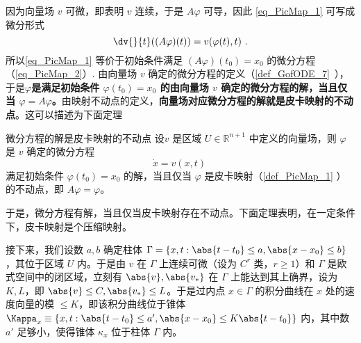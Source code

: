 因为向量场 $v$ 可微，即表明 $v$ 连续，于是 $A\varphi$ 可导，因此 \autoref{eq_PicMap_1} 可写成微分形式
\begin{equation}\label{eq_PicMap_2}
\dv{}{t}((A\varphi)(t))=v(\varphi(t),t)~.
\end{equation}
所以\autoref{eq_PicMap_1} 等价于初始条件满足 $(A\varphi)(t_0)=x_0$ 的微分方程（\autoref{eq_PicMap_2}）. 由向量场 $v$ 确定的微分方程的定义（\autoref{def_GofODE_7}~），于是\textbf{$\varphi$是满足初始条件 $\varphi(t_0)=x_0$ 的由向量场 $v$ 确定的微分方程的解，当且仅当 $\varphi=A\varphi$。}由映射不动点的定义，\textbf{向量场对应微分方程的解就是皮卡映射的不动点}。这可以描述为下面定理
\begin{theorem}{微分方程的解是皮卡映射的不动点}\label{the_PicMap_1}
设$v$ 是区域 $U\in\mathbb R^{n+1}$ 中定义的向量场，则 $\varphi$ 是 $v$ 确定的微分方程
\begin{equation}\label{eq_PicMap_3}
\dot x=v(x,t)~
\end{equation}
满足初始条件 $\varphi(t_0)=x_0$ 的解，当且仅当 $\varphi$ 是皮卡映射（\autoref{def_PicMap_1} ）的不动点，即 $A\varphi=\varphi$。
\end{theorem}
于是，微分方程有解，当且仅当皮卡映射存在不动点。下面定理表明，在一定条件下，皮卡映射是个压缩映射。

接下来，我们设数 $a,b$ 确定柱体 $\Gamma=\{x,t:\abs{t-t_0}\leq a,\abs{x-x_0}\leq b\}$，其位于区域 $U$ 内。于是由 $v$ 在 $\Gamma$ 上连续可微（设为 $C^r$ 类，$r\geq1$）和 $\Gamma$ 是欧式空间中的闭区域，立刻有 $\abs{v},\abs{v_*}$ 在 $\Gamma$ 上能达到其上确界，设为 $K,L$，即 $\abs{v}\leq C,\abs{v_*}\leq L$。于是过内点 $x\in\Gamma$ 的积分曲线在 $x$ 处的速度向量的模 $\leq K$，即该积分曲线位于锥体 $\Kappa_x\equiv\{x,t:\abs{t-t_0}\leq a',\abs{x-x_0}\leq K\abs{t-t_0}\}$ 内，其中数 $a'$ 足够小，使得锥体 $\kappa_x$ 位于柱体 $\Gamma$ 内。

